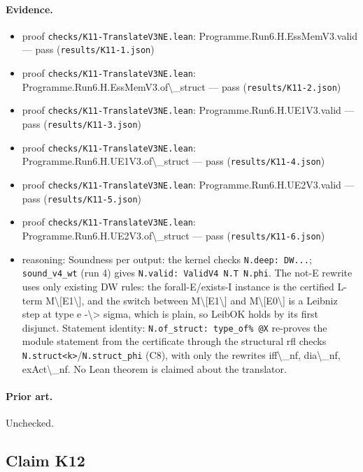 \documentclass{article}
\begin{document}
\paragraph{Evidence.}
\begin{itemize}
\item proof \texttt{checks/K11-TranslateV3NE.lean}: Programme.Run6.H.EssMemV3.valid --- pass (\texttt{results/K11-1.json})
\item proof \texttt{checks/K11-TranslateV3NE.lean}: Programme.Run6.H.EssMemV3.of\textbackslash{}\_struct --- pass (\texttt{results/K11-2.json})
\item proof \texttt{checks/K11-TranslateV3NE.lean}: Programme.Run6.H.UE1V3.valid --- pass (\texttt{results/K11-3.json})
\item proof \texttt{checks/K11-TranslateV3NE.lean}: Programme.Run6.H.UE1V3.of\textbackslash{}\_struct --- pass (\texttt{results/K11-4.json})
\item proof \texttt{checks/K11-TranslateV3NE.lean}: Programme.Run6.H.UE2V3.valid --- pass (\texttt{results/K11-5.json})
\item proof \texttt{checks/K11-TranslateV3NE.lean}: Programme.Run6.H.UE2V3.of\textbackslash{}\_struct --- pass (\texttt{results/K11-6.json})
\item reasoning: Soundness per output: the kernel checks \texttt{N.deep: DW...}; \texttt{sound\_v4\_wt} (run 4) gives \texttt{N.valid: ValidV4 N.T N.phi}. The not-E rewrite uses only existing DW rules: the forall-E/exists-I instance is the certified L-term M\textbackslash{}[E1\textbackslash{}], and the switch between M\textbackslash{}[E1\textbackslash{}] and M\textbackslash{}[E0\textbackslash{}] is a Leibniz step at type e -\textbackslash{}\textgreater{} sigma, which is plain, so LeibOK holds by its first disjunct. Statement identity: \texttt{N.of\_struct: type\_of\% @X} re-proves the module statement from the certificate through the structural rfl checks \texttt{N.struct\textless{}k\textgreater{}}/\texttt{N.struct\_phi} (C8), with only the rewrites iff\textbackslash{}\_nf, dia\textbackslash{}\_nf, exAct\textbackslash{}\_nf. No Lean theorem is claimed about the translator.
\end{itemize}

\paragraph{Prior art.} Unchecked.

\subsection*{Claim K12}
\end{document}
